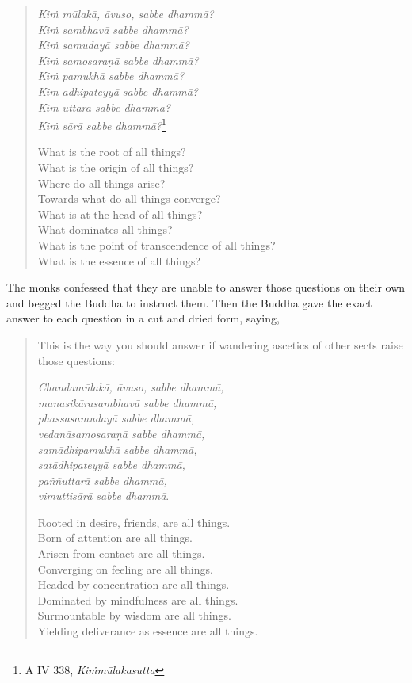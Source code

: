 \begin{quote}
\emph{Kiṁ mūlakā, āvuso, sabbe dhammā?}\\
\emph{Kiṁ sambhavā sabbe dhammā?}\\
\emph{Kiṁ samudayā sabbe dhammā?}\\
\emph{Kiṁ samosaraṇā sabbe dhammā?}\\
\emph{Kiṁ pamukhā sabbe dhammā?}\\
\emph{Kim adhipateyyā sabbe dhammā?}\\
\emph{Kim uttarā sabbe dhammā?}\\
\emph{Kiṁ sārā sabbe dhammā?}\footnote{A IV 338, \emph{Kiṁmūlakasutta}}

What is the root of all things?\\
What is the origin of all things?\\
Where do all things arise?\\
Towards what do all things converge?\\
What is at the head of all things?\\
What dominates all things?\\
What is the point of transcendence of all things?\\
What is the essence of all things?
\end{quote}

The monks confessed that they are unable to answer those questions on their own and begged the Buddha to instruct them. Then the Buddha gave the exact answer to each question in a cut and dried form, saying,

\begin{quote}
This is the way you should answer if wandering ascetics of other sects raise those questions:

\emph{Chandamūlakā, āvuso, sabbe dhammā,}\\
\emph{manasikārasambhavā sabbe dhammā,}\\
\emph{phassasamudayā sabbe dhammā,}\\
\emph{vedanāsamosaraṇā sabbe dhammā,}\\
\emph{samādhipamukhā sabbe dhammā,}\\
\emph{satādhipateyyā sabbe dhammā,}\\
\emph{paññuttarā sabbe dhammā,}\\
\emph{vimuttisārā sabbe dhammā}.

Rooted in desire, friends, are all things.\\
Born of attention are all things.\\
Arisen from contact are all things.\\
Converging on feeling are all things.\\
Headed by concentration are all things.\\
Dominated by mindfulness are all things.\\
Surmountable by wisdom are all things.\\
Yielding deliverance as essence are all things.
\end{quote}

